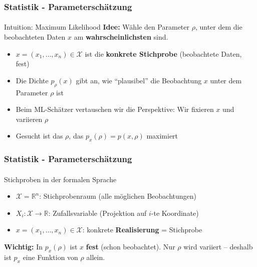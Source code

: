 \documentclass{beamer}
\begin{document}
 
\begin{frame}
    \frametitle{Statistik - Parameterschätzung}
\framesubtitle{}
\begin{block}{Intuition: Maximum Likelihood}
\textbf{Idee:} Wähle den Parameter $\rho$, unter dem die beobachteten Daten $x$ am \textbf{wahrscheinlichsten} sind.
\begin{itemize}
\item $x = (x_1, \ldots, x_n) \in \mathcal{X}$ ist die \textbf{konkrete Stichprobe} (beobachtete Daten, fest)
\item Die Dichte $p_\rho(x)$ gibt an, wie ``plausibel'' die Beobachtung $x$ unter dem Parameter $\rho$ ist
\item Beim ML-Schätzer vertauschen wir die Perspektive: Wir fixieren $x$ und variieren $\rho$
\item Gesucht ist das $\rho$, das $p_x(\rho) = p(x, \rho)$ maximiert
\end{itemize}
\end{block}

 \end{frame}


\begin{frame}
    \frametitle{Statistik - Parameterschätzung}
\framesubtitle{}
\begin{block}{Stichproben in der formalen Sprache}
\begin{itemize}
\item $\mathcal{X} = \mathbb{R}^n$: Stichprobenraum (alle möglichen Beobachtungen)
\item $X_i : \mathcal{X} \to \mathbb{R}$: Zufallsvariable (Projektion auf $i$-te Koordinate)
\item $x = (x_1, \ldots, x_n) \in \mathcal{X}$: konkrete \textbf{Realisierung} = Stichprobe
\end{itemize}
\textbf{Wichtig:} In $p_x(\rho)$ ist $x$ \textbf{fest} (schon beobachtet). Nur $\rho$ wird variiert -- deshalb ist $p_x$ eine Funktion von $\rho$ allein.
\end{block}

 \end{frame}
\end{document}
